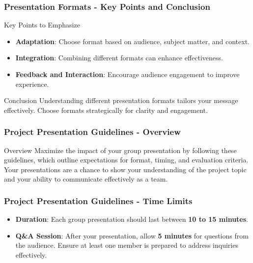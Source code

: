 \documentclass[aspectratio=169]{beamer}
\begin{document}
\begin{frame}[fragile]
    \frametitle{Presentation Formats - Key Points and Conclusion}
    \begin{block}{Key Points to Emphasize}
        \begin{itemize}
            \item \textbf{Adaptation}: Choose format based on audience, subject matter, and context.
            \item \textbf{Integration}: Combining different formats can enhance effectiveness.
            \item \textbf{Feedback and Interaction}: Encourage audience engagement to improve experience.
        \end{itemize}
    \end{block}
    \begin{block}{Conclusion}
        Understanding different presentation formats tailors your message effectively. Choose formats strategically for clarity and engagement.
    \end{block}
\end{frame}

\begin{frame}[fragile]
    \frametitle{Project Presentation Guidelines - Overview}
    \begin{block}{Overview}
        Maximize the impact of your group presentation by following these guidelines, which outline expectations for format, timing, and evaluation criteria. Your presentations are a chance to show your understanding of the project topic and your ability to communicate effectively as a team.
    \end{block}
\end{frame}

\begin{frame}[fragile]
    \frametitle{Project Presentation Guidelines - Time Limits}
    \begin{itemize}
        \item \textbf{Duration}: Each group presentation should last between \textbf{10 to 15 minutes}.
        \item \textbf{Q\&A Session}: After your presentation, allow \textbf{5 minutes} for questions from the audience. Ensure at least one member is prepared to address inquiries effectively.
    \end{itemize}
\end{frame}
\end{document}
